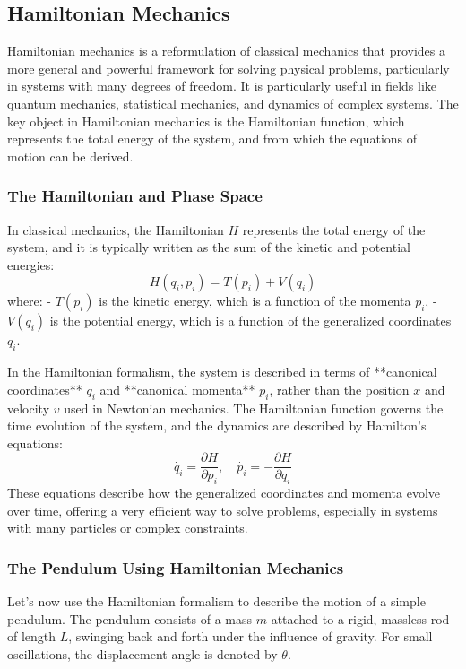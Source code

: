\documentclass{article}
\begin{document}
\subsection{Hamiltonian Mechanics}

Hamiltonian mechanics is a reformulation of classical mechanics that provides a more general and powerful framework for solving physical problems, particularly in systems with many degrees of freedom. It is particularly useful in fields like quantum mechanics, statistical mechanics, and dynamics of complex systems. The key object in Hamiltonian mechanics is the Hamiltonian function, which represents the total energy of the system, and from which the equations of motion can be derived.

\subsubsection*{The Hamiltonian and Phase Space}

In classical mechanics, the Hamiltonian \( H \) represents the total energy of the system, and it is typically written as the sum of the kinetic and potential energies:
\[
H(q_i, p_i) = T(p_i) + V(q_i)
\]
where:
- \( T(p_i) \) is the kinetic energy, which is a function of the momenta \( p_i \),
- \( V(q_i) \) is the potential energy, which is a function of the generalized coordinates \( q_i \).

In the Hamiltonian formalism, the system is described in terms of **canonical coordinates** \( q_i \) and **canonical momenta** \( p_i \), rather than the position \( x \) and velocity \( v \) used in Newtonian mechanics. The Hamiltonian function governs the time evolution of the system, and the dynamics are described by Hamilton's equations:
\[
\dot{q_i} = \frac{\partial H}{\partial p_i}, \quad \dot{p_i} = -\frac{\partial H}{\partial q_i}
\]
These equations describe how the generalized coordinates and momenta evolve over time, offering a very efficient way to solve problems, especially in systems with many particles or complex constraints.

\subsubsection*{The Pendulum Using Hamiltonian Mechanics}

Let’s now use the Hamiltonian formalism to describe the motion of a simple pendulum. The pendulum consists of a mass \( m \) attached to a rigid, massless rod of length \( L \), swinging back and forth under the influence of gravity. For small oscillations, the displacement angle is denoted by \( \theta \).
\end{document}
